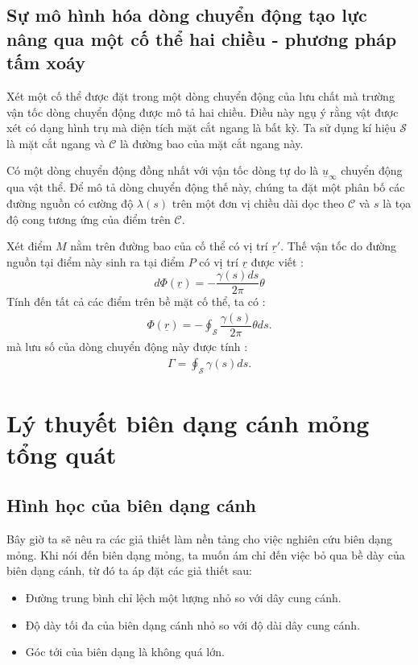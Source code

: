 \documentclass[KHI_DONG_HOC.tex]{subfiles}
\begin{document}
\subsection{Sự mô hình hóa dòng chuyển động tạo lực nâng qua một cố thể hai chiều - phương pháp tấm xoáy}\label{Vortex_sheet}

	Xét một cố thể được đặt trong một dòng chuyển động của lưu chất mà trường vận tốc dòng chuyển động được mô tả hai chiều. Điều này ngụ ý rằng vật được xét có dạng hình trụ mà diện tích mặt cắt ngang là bất kỳ. Ta sử dụng kí hiệu $\mathcal{S}$ là mặt cắt ngang và $\mathcal{C}$ là đường bao của mặt cắt ngang này.

	Có một dòng chuyển động đồng nhất với vận tốc dòng tự do là $\underline{u}_\infty$ chuyển động qua vật thể. Để mô tả dòng chuyển động thế này, chúng ta đặt một phân bố các đường nguồn có cường độ $\lambda(s)$ trên một đơn vị chiều dài dọc theo $\mathcal{C}$ và $s$ là tọa độ cong tương ứng của điểm trên $\mathcal{C}$.

	Xét điểm $M$ nằm trên đường bao của cố thể có vị trí $\underline{r}'$. Thế vận tốc do đường nguồn tại điểm này sinh ra tại điểm $P$ có vị trí $\underline{r}$ được viết :
		\[
			d\Phi(\underline{r})=-\dfrac{\gamma(s)ds}{2\pi}\theta
		\]
	Tính đến tất cả các điểm trên bề mặt cố thể, ta có :
		\begin{equation}
			\begin{aligned}
				\Phi(\underline{r})=-\oint_\mathcal{S}\dfrac{\gamma(s)}{2\pi}\theta ds.
			\end{aligned}
		\end{equation}
	mà lưu số của dòng chuyển động này được tính :
		\begin{equation}
			\begin{aligned}
				\Gamma=\oint_\mathcal{S}\gamma(s)ds.
			\end{aligned}
		\end{equation}

\section{Lý thuyết biên dạng cánh mỏng tổng quát}
\subsection{Hình học của biên dạng cánh}
	
	Bây giờ ta sẽ nêu ra các giả thiết làm nền tảng cho việc nghiên cứu biên dạng mỏng. Khi nói đến biên dạng mỏng, ta muốn ám chỉ đến việc bỏ qua bề dày của biên dạng cánh, từ đó ta áp đặt các giả thiết sau:
		\begin{itemize}
			\item Đường trung bình chỉ lệch một lượng nhỏ so với dây cung cánh.
			\item Độ dày tối đa của biên dạng cánh nhỏ so với độ dài dây cung cánh.
			\item Góc tới của biên dạng là không quá lớn.
		\end{itemize}
	
\end{document}
